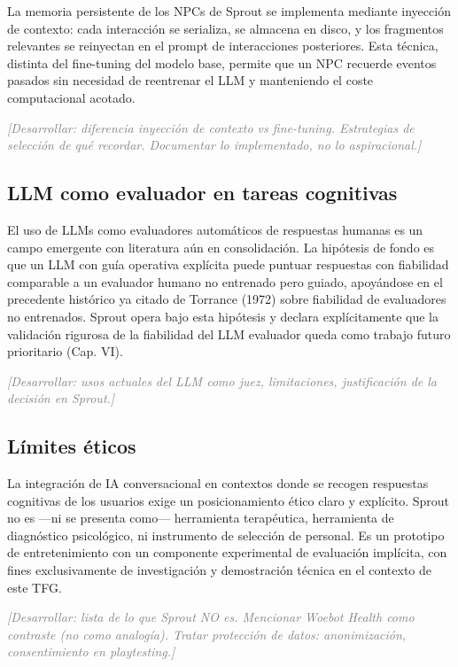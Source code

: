 \documentclass[12pt,twoside,titlepage]{report}
\begin{document}
La memoria persistente de los NPCs de Sprout se implementa mediante inyección de contexto: cada interacción se serializa, se almacena en disco, y los fragmentos relevantes se reinyectan en el prompt de interacciones posteriores. Esta técnica, distinta del fine-tuning del modelo base, permite que un NPC recuerde eventos pasados sin necesidad de reentrenar el LLM y manteniendo el coste computacional acotado.

\textcolor{gray}{\textit{[Desarrollar: diferencia inyección de contexto vs fine-tuning. Estrategias de selección de qué recordar. Documentar lo implementado, no lo aspiracional.]}}

\subsection{LLM como evaluador en tareas cognitivas}

El uso de LLMs como evaluadores automáticos de respuestas humanas es un campo emergente con literatura aún en consolidación. La hipótesis de fondo es que un LLM con guía operativa explícita puede puntuar respuestas con fiabilidad comparable a un evaluador humano no entrenado pero guiado, apoyándose en el precedente histórico ya citado de Torrance (1972) sobre fiabilidad de evaluadores no entrenados. Sprout opera bajo esta hipótesis y declara explícitamente que la validación rigurosa de la fiabilidad del LLM evaluador queda como trabajo futuro prioritario (Cap. VI).

\textcolor{gray}{\textit{[Desarrollar: usos actuales del LLM como juez, limitaciones, justificación de la decisión en Sprout.]}}

\subsection{Límites éticos}

La integración de IA conversacional en contextos donde se recogen respuestas cognitivas de los usuarios exige un posicionamiento ético claro y explícito. Sprout no es ---ni se presenta como--- herramienta terapéutica, herramienta de diagnóstico psicológico, ni instrumento de selección de personal. Es un prototipo de entretenimiento con un componente experimental de evaluación implícita, con fines exclusivamente de investigación y demostración técnica en el contexto de este TFG.

\textcolor{gray}{\textit{[Desarrollar: lista de lo que Sprout NO es. Mencionar Woebot Health como contraste (no como analogía). Tratar protección de datos: anonimización, consentimiento en playtesting.]}}
\end{document}
